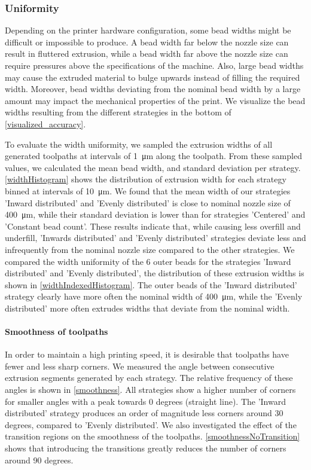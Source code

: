 








\subsubsection{Uniformity}
Depending on the printer hardware configuration, some bead widths might be difficult or impossible to produce.
A bead width far below the nozzle size can result in fluttered extrusion, while a bead width far above the nozzle size can require pressures above the specifications of the machine. 
Also, large bead widths may cause the extruded material to bulge upwards instead of filling the required width.
Moreover, bead widths deviating from the nominal bead width by a large amount may impact the mechanical properties of the print.
We visualize the bead widths resulting from the different strategies in the bottom of \cref{visualized_accuracy}.

To evaluate the width uniformity, we sampled the extrusion widths of all generated toolpaths 
at intervals of \SI{1}{\micro\meter} along the toolpath.
From these sampled values, we calculated the mean bead width, and standard deviation per strategy.
\cref{widthHistogram} shows the distribution of extrusion width for each strategy binned at intervals of \SI{10}{\micro\meter}.
We found that the mean width of our strategies 'Inward distributed' and 'Evenly distributed' is close to nominal nozzle size of \SI{400}{\micro\meter}, while their standard deviation is lower than for strategies 'Centered' and 'Constant bead count'. 
These results indicate that, while causing less overfill and underfill, 'Inwards distributed' and 'Evenly distributed' strategies deviate less and infrequently from the nominal nozzle size compared to the other strategies.
We compared the width uniformity of the 6 outer beads for the strategies 'Inward distributed' and 'Evenly distributed', the distribution of these extrusion widths is shown in \cref{widthIndexedHistogram}. 
The outer beads of the 'Inward distributed' strategy clearly have more often the nominal width of \SI{400}{\micro\meter}, while the 'Evenly distributed' more often extrudes widths that deviate from the nominal width.

\paragraph{Smoothness of toolpaths}
In order to maintain a high printing speed, it is desirable that toolpaths have fewer and less sharp corners. 
We measured the angle between consecutive extrusion segments generated by each strategy.
The relative frequency of these angles is shown in \cref{smoothness}.
All strategies show a higher number of corners for smaller angles with a peak towards 0 degrees (straight line).
The 'Inward distributed' strategy produces an order of magnitude less corners around 30 degrees, compared to 'Evenly distributed'. 
We also investigated the effect of the transition regions on the smoothness of the toolpaths. 
\cref{smoothnessNoTransition} shows that introducing the transitions greatly reduces the number of corners around 90 degrees. 

